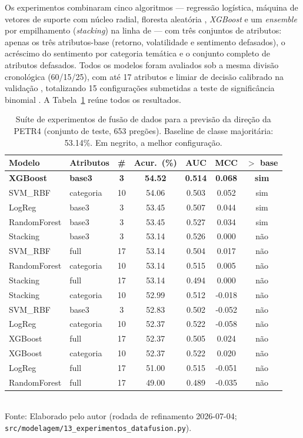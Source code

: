 Os experimentos combinaram cinco algoritmos --- regressão logística, máquina de vetores de
suporte com núcleo radial, floresta aleatória \cite{ballings_evaluating_2015}, \textit{XGBoost}
e um \textit{ensemble} por empilhamento (\textit{stacking}) na linha de 
--- com três conjuntos de atributos: apenas os três atributos-base (retorno, volatilidade e
sentimento defasados), o acréscimo do sentimento por categoria temática \cite{nguyen_sentiment_2015}
e o conjunto completo de atributos defasados. Todos os modelos foram avaliados sob a mesma divisão
cronológica (60/15/25), com até 17 atributos e limiar de
decisão calibrado na validação \cite{nobre_combining_2019}, totalizando 15
configurações submetidas a teste de significância binomial \cite{oliveira_impact_2017}. A
Tabela~\ref{tab:suite_experimentos} reúne todos os resultados.

\begin{table}[htpb]
\centering
\caption{Suíte de experimentos de fusão de dados para a previsão da direção da PETR4 (conjunto de teste, 653 pregões). Baseline de classe majoritária: 53.14\%. Em negrito, a melhor configuração.}
\label{tab:suite_experimentos}
\begin{tabular}{l l c c c c c}
\hline
\textbf{Modelo} & \textbf{Atributos} & \textbf{\#} & \textbf{Acur.\ (\%)} & \textbf{AUC} & \textbf{MCC} & \textbf{$>$ base} \\ \hline
\textbf{XGBoost } & \textbf{ base3 } & \textbf{ 3 } & \textbf{ 54.52 } & \textbf{ 0.514 } & \textbf{ 0.068 } & \textbf{ sim} \\
SVM\_RBF & categoria & 10 & 54.06 & 0.503 & 0.052 & sim \\
LogReg & base3 & 3 & 53.45 & 0.507 & 0.044 & sim \\
RandomForest & base3 & 3 & 53.45 & 0.527 & 0.034 & sim \\
Stacking & base3 & 3 & 53.14 & 0.526 & 0.000 & não \\
SVM\_RBF & full & 17 & 53.14 & 0.504 & 0.017 & não \\
RandomForest & categoria & 10 & 53.14 & 0.515 & 0.005 & não \\
Stacking & full & 17 & 53.14 & 0.494 & 0.000 & não \\
Stacking & categoria & 10 & 52.99 & 0.512 & -0.018 & não \\
SVM\_RBF & base3 & 3 & 52.83 & 0.502 & -0.052 & não \\
LogReg & categoria & 10 & 52.37 & 0.522 & -0.058 & não \\
XGBoost & full & 17 & 52.37 & 0.505 & 0.024 & não \\
XGBoost & categoria & 10 & 52.37 & 0.522 & 0.020 & não \\
LogReg & full & 17 & 51.00 & 0.515 & -0.051 & não \\
RandomForest & full & 17 & 49.00 & 0.489 & -0.035 & não \\
\hline
\end{tabular}
\vspace{0.2cm}
{\small \\ Fonte: Elaborado pelo autor (rodada de refinamento 2026-07-04; \texttt{src/modelagem/13\_experimentos\_datafusion.py}).}
\end{table}

